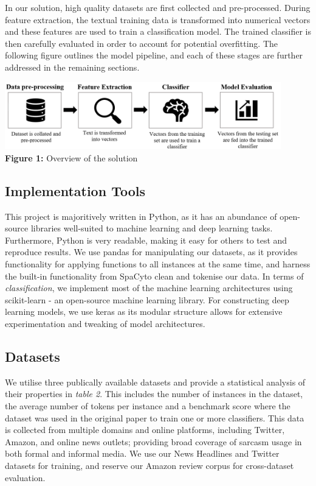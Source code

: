 \documentclass[12pt,a4paper]{article}
\begin{document}
In our solution, high quality datasets are first collected and pre-processed. During feature extraction, the textual training data is transformed into numerical vectors and these features are used to train a classification model. The trained classifier is then carefully evaluated in order to account for potential overfitting. The following figure outlines the model pipeline, and each of these stages are further addressed in the remaining sections.

\begin{center}
	\includegraphics[width=0.9\textwidth]{Images/modelpipeline2.png}
	\label{Model Pipeline}\\
	\textbf{Figure 1:} Overview of the solution
\end{center}

\subsection{Implementation Tools}\vspace{-4.2pt}
\noindent This project is majoritively written in Python, as it has an abundance of open-source libraries well-suited to machine learning and deep learning tasks. Furthermore, Python is very readable, making it easy for others to test and reproduce results. We use pandas for manipulating our datasets, as it provides functionality for applying functions to all instances at the same time, and harness the built-in functionality from SpaCy\footnotemark[3] to clean and tokenise our data. In terms of \textit{classification}, we implement most of the machine learning architectures using scikit-learn \cite{mckinney-proc-scipy-2010} - an open-source machine learning library. For constructing deep learning models, we use keras as its modular structure allows for extensive experimentation and tweaking of model architectures.

\subsection{Datasets}
\vspace{-4.2pt}\noindent We utilise three publically available datasets and provide a statistical analysis of their properties in \textit{table 2}. This includes the number of instances in the dataset, the average number of tokens per instance and a benchmark score where the dataset was used in the original paper to train one or more classifiers. This data is collected from multiple domains and online platforms, including Twitter, Amazon, and online news outlets; providing broad coverage of sarcasm usage in both formal and informal media. We use our News Headlines and Twitter datasets for training, and reserve our Amazon review corpus for cross-dataset evaluation.\vspace{-5pt}
\end{document}

